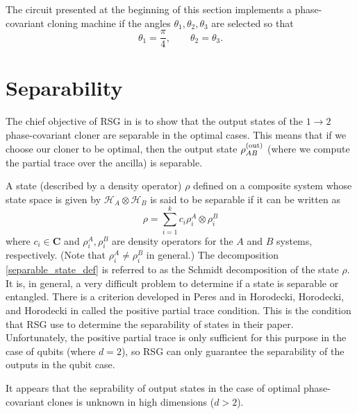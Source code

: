 \documentclass[reqno]{amsart}
\numberwithin{lemma}{section}
\numberwithin{proposition}{section}
\newcommand{\C}{\mathbf{C}}
\newcommand{\out}{\textnormal{out}}
\begin{document}
{\medskip

 The circuit presented at the beginning of this section implements a phase-covariant cloning machine if the angles $\theta_{1}, \theta_{2}, \theta_{3}$ are selected so that
\begin{equation*}
\theta_{1} = \frac{\pi}{4}, \qquad \theta_{2} = \theta_{3}.
\end{equation*}

{}

\section{Separability}
The chief objective of RSG in \cite{REZAKHANI2005278} is to show that the output states of the $1 \to 2$ phase-covariant cloner are separable in the optimal cases. This means that if we choose our cloner to be optimal, then the output state $\rho_{AB}^{(\out)}$ (where we compute the partial trace over the ancilla) is separable.

A state (described by a density operator) $\rho$ defined on a composite system whose state space is given by $\mathcal{H}_{A} \otimes \mathcal{H}_{B}$ is said to be separable if it can be written as
\begin{equation}
\label{separable_state_def}
\rho = \sum_{i =1}^{k} c_{i} \rho_{i}^{A} \otimes \rho_{i}^{B}
\end{equation}
where $c_{i} \in \C$ and $\rho_{i}^{A}, \rho_{i}^{B}$ are density operators for the $A$ and $B$ systems, respectively. (Note that $\rho_{i}^{A} \neq \rho_{i}^{B}$ in general.) The decomposition \eqref{separable_state_def} is referred to as the Schmidt decomposition of the state $\rho$. It is, in general, a very difficult problem to determine if a state is separable or entangled. There is a criterion developed in Peres \cite{peres1996separability} and in Horodecki, Horodecki, and Horodecki in \cite{HORODECKI19961} called the positive partial trace condition. This is the condition that RSG use to determine the separability of states in their paper. Unfortunately, the positive partial trace is only sufficient for this purpose in the case of qubits (where $d=2$), so RSG can only guarantee the separability of the outputs in the qubit case.

\medskip

 It appears that the seprability of output states in the case of optimal phase-covariant clones is unknown in high dimensions ($d > 2$).




}
\end{document}
